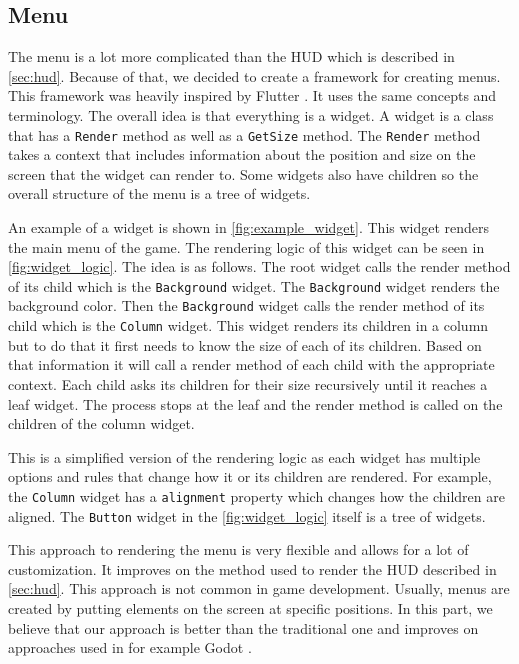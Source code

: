 \subsection{Menu} \label{subsec:menu}
The menu is a lot more complicated than the HUD which is described in \autoref{sec:hud}.
Because of that, we decided to create a framework for creating menus.
This framework was heavily inspired by Flutter \cite{flutter}.
It uses the same concepts and terminology.
The overall idea is that everything is a widget.
A widget is a class that has a \texttt{Render} method as well as a \texttt{GetSize} method.
The \texttt{Render} method takes a context that includes information about the position and size on the screen that the widget can render to.
Some widgets also have children so the overall structure of the menu is a tree of widgets.

An example of a widget is shown in \autoref{fig:example_widget}.
This widget renders the main menu of the game.
The rendering logic of this widget can be seen in \autoref{fig:widget_logic}.
The idea is as follows.
The root widget calls the render method of its child which is the \texttt{Background} widget.
The \texttt{Background} widget renders the background color.
Then the \texttt{Background} widget calls the render method of its child which is the \texttt{Column} widget.
This widget renders its children in a column but to do that it first needs to know the size of each of its children.
Based on that information it will call a render method of each child with the appropriate context.
Each child asks its children for their size recursively until it reaches a leaf widget.
The process stops at the leaf and the render method is called on the children of the column widget.

This is a simplified version of the rendering logic as each widget has multiple options and rules that change how it or its children are rendered.
For example, the \texttt{Column} widget has a \texttt{alignment} property which changes how the children are aligned.
The \texttt{Button} widget in the \autoref{fig:widget_logic} itself is a tree of widgets.

This approach to rendering the menu is very flexible and allows for a lot of customization.
It improves on the method used to render the HUD described in \autoref{sec:hud}.
This approach is not common in game development.
Usually, menus are created by putting elements on the screen at specific positions.
In this part, we believe that our approach is better than the traditional one and improves on approaches used in for example Godot \cite{Godot-Menu}.

